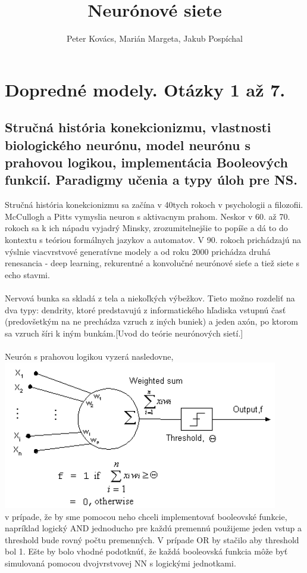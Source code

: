 \documentclass{article}
\title{ Neurónové siete}
\author{Peter Kovács, Marián Margeta, Jakub Pospíchal}
\date{ }
\numberwithin{equation}{section} %
\begin{document}
\maketitle
\tableofcontents
\newpage
\section{Dopredné modely. Otázky 1 až 7. }
\subsection{Stručná história konekcionizmu, vlastnosti biologického neurónu, model neurónu s prahovou logikou,
implementácia Booleových funkcií. Paradigmy učenia a typy úloh pre NS.}
Stručná história konekcionizmu sa začína v 40tych rokoch v psychologii a filozofii. McCullogh a Pitts vymyslia neuron s aktivacnym prahom. Neskor v 60. až 70. rokoch sa k ich nápadu vyjadrý Minsky, zrozumitelnejšie to popíše a dá to do kontextu s teóriou formálnych jazykov a automatov. V 90. rokoch prichádzajú na výslnie viacvrstvové generatívne modely a od roku 2000 prichádza druhá renesancia - deep learning, rekurentné a konvolučné neurónové sieťe a tiež siete s echo stavmi.
\\\\
Nervová bunka sa skladá z tela a niekoľkých výbežkov. Tieto možno rozdeliť na dva typy: dendrity, ktoré predstavujú z informatického hľadiska vstupnú časť (predovšetkým na ne prechádza vzruch z iných buniek) a jeden axón, po ktorom sa vzruch šíri k iným bunkám.[Uvod do teórie neurónových sietí.]
\\\\
Neurón s prahovou logikou vyzerá nasledovne, \\
\includegraphics[width=12cm]{imgs/threshold_neuron}\\
v prípade, že by sme pomocou neho chceli implementovať booleovské funkcie, napríklad logický AND jednoducho pre každú premennú použijeme jeden vstup a threshold bude rovný počtu premenných. V prípade OR by stačilo aby threshold bol 1. Ešte by bolo vhodné podotknúť, že každá booleovská funkcia môže byť simulovaná pomocou dvojvrstvovej NN s logickými jednotkami.
\end{document}
